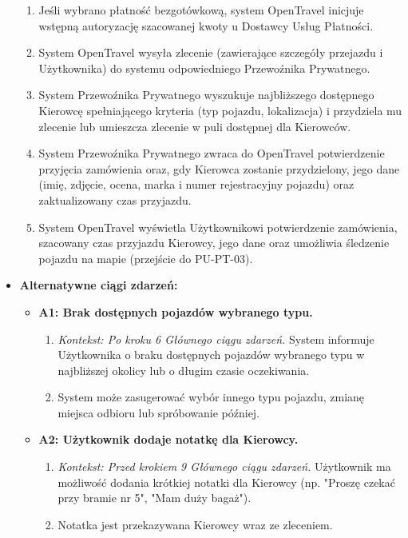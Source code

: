 \documentclass[a4paper,12pt]{article}
\begin{document}
\begin{itemize}
\begin{enumerate}
            \item Jeśli wybrano płatność bezgotówkową, system OpenTravel inicjuje wstępną autoryzację szacowanej kwoty u Dostawcy Usług Płatności.
            \item System OpenTravel wysyła zlecenie (zawierające szczegóły przejazdu i Użytkownika) do systemu odpowiedniego Przewoźnika Prywatnego.
            \item System Przewoźnika Prywatnego wyszukuje najbliższego dostępnego Kierowcę spełniającego kryteria (typ pojazdu, lokalizacja) i przydziela mu zlecenie lub umieszcza zlecenie w puli dostępnej dla Kierowców.
            \item System Przewoźnika Prywatnego zwraca do OpenTravel potwierdzenie przyjęcia zamówienia oraz, gdy Kierowca zostanie przydzielony, jego dane (imię, zdjęcie, ocena, marka i numer rejestracyjny pojazdu) oraz zaktualizowany czas przyjazdu.
            \item System OpenTravel wyświetla Użytkownikowi potwierdzenie zamówienia, szacowany czas przyjazdu Kierowcy, jego dane oraz umożliwia śledzenie pojazdu na mapie (przejście do PU-PT-03).
        \end{enumerate}
    \item \textbf{Alternatywne ciągi zdarzeń:}
        \begin{itemize}
            \item \textbf{A1: Brak dostępnych pojazdów wybranego typu.}
                \begin{enumerate}
                    \item \textit{Kontekst: Po kroku 6 Głównego ciągu zdarzeń.} System informuje Użytkownika o braku dostępnych pojazdów wybranego typu w najbliższej okolicy lub o długim czasie oczekiwania.
                    \item System może zasugerować wybór innego typu pojazdu, zmianę miejsca odbioru lub spróbowanie później.
                \end{enumerate}
            \item \textbf{A2: Użytkownik dodaje notatkę dla Kierowcy.}
                \begin{enumerate}
                    \item \textit{Kontekst: Przed krokiem 9 Głównego ciągu zdarzeń.} Użytkownik ma możliwość dodania krótkiej notatki dla Kierowcy (np. "Proszę czekać przy bramie nr 5", "Mam duży bagaż").
                    \item Notatka jest przekazywana Kierowcy wraz ze zleceniem.

\end{enumerate}
\end{itemize}
\end{itemize}
\end{document}
